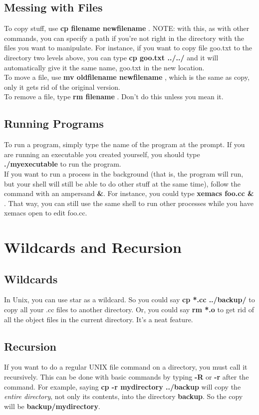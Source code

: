 \documentclass[12pt, letterpaper]{article}
\begin{document}
\subsection{Messing with Files}
To copy stuff, use {\bf cp filename newfilename }. NOTE: with this, as 
with other commands, you can specify a path if you're not right in the 
directory with the files you want to manipulate. For instance, if
you want to copy file goo.txt to the directory two levels above, you
can type {\bf cp goo.txt ../../ } and it will automatically give it
the same name, goo.txt in the new location.\\
To move a file, use {\bf mv oldfilename newfilename }, which is the
same as copy, only it gets rid of the original version.\\
To remove a file, type {\bf rm filename }. Don't do this unless you
mean it.\\

\subsection{Running Programs}
To run a program, simply type the name of the program at the
prompt. If you are running an executable you created yourself, you
should type {\bf ./myexecutable } to run the program.\\
If you want to run a process in the background (that is, the program
will run, but your shell will still be able to do other stuff at the
same time), follow the command with an ampersand {\bf \&}. For
instance, you could type {\bf xemacs foo.cc \& }. That way, you can
still use the same shell to run other processes while you have xemacs
open to edit foo.cc.


\section{Wildcards and Recursion}

\subsection{Wildcards}
In Unix, you can use star {\bf *} as a wildcard. So you could say {\bf 
cp *.cc ../backup/ } to copy all your .cc files to another
directory. Or, you could say {\bf rm *.o } to get rid of all the
object files in the current directory. It's a neat feature.

\subsection{Recursion}
If you want to do a regular UNIX file command on a directory, you must 
call it recursively. This can be done with basic commands by typing
{\bf -R} or {\bf -r} after the command. For example, saying {\bf cp -r 
mydirectory ../backup} will copy the {\it entire directory}, not only
its contents, into the directory {\bf backup}. So the copy will be
{\bf backup/mydirectory}.
\end{document}
